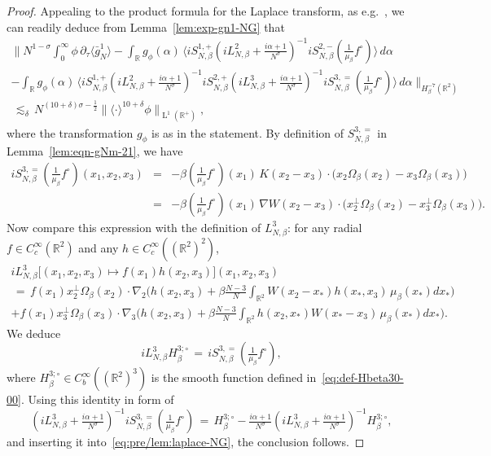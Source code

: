 \documentclass[a4paper,11pt,reqno,noindent]{amsart}
\theoremstyle{plain}
\numberwithin{equation}{section}
\newcommand{\R}{\mathbb R}
\newcommand{\3}{|\!|\!|}
\newcommand{\Ld}{\operatorname{L}}
\begin{document}
\begin{proof}
Appealing to the product formula for the Laplace transform, as e.g.~\cite[Lemma~5.2]{DSR-21}, we can readily deduce from Lemma~\ref{lem:exp-gn1-NG} that
\begin{multline}\label{eq:pre/lem:laplace-NG}
\Big\|N^{1-\sigma}\int_0^\infty\phi\,\partial_\tau \langle\bar g_N^1\rangle-\int_\R g_\phi(\alpha)\,\big\langle iS_{N,\beta}^{1,+}(iL_{N,\beta}^2+\tfrac{i\alpha+1}{N^\sigma})^{-1} iS_{N,\beta}^{2,-}(\tfrac1{\mu_\beta}f^\circ)\big\rangle\,d\alpha\\
-\int_\R g_\phi(\alpha)\,\big\langle iS_{N,\beta}^{1,+}(iL_{N,\beta}^2+\tfrac{i\alpha+1}{N^\sigma})^{-1}iS_{N,\beta}^{2,+}(iL_{N,\beta}^3+\tfrac{i\alpha+1}{N^\sigma})^{-1}iS_{N,\beta}^{3,=}(\tfrac1{\mu_\beta}f^\circ)\big\rangle\,d\alpha\Big\|_{H^{-7}_\beta(\R^2)}\\
\,\lesssim_\delta\,N^{(10+\delta)\sigma-\frac12}\|\langle\cdot\rangle^{10+\delta}\phi\|_{\Ld^1(\R^+)},
\end{multline}
where the transformation $g_\phi$ is as in the statement.
By definition of $S_{N,\beta}^{3,=}$ in Lemma~\ref{lem:eqn-gNm-21}, we have
\begin{eqnarray*}
iS_{N,\beta}^{3,=}(\tfrac1{\mu_\beta}f^\circ)(x_1,x_2,x_3)&=&-\beta (\tfrac1{\mu_\beta}f^\circ)(x_1) \,K(x_2-x_3)\cdot \big(x_2\Omega_\beta(x_2)-x_3\Omega_\beta(x_3)\big)\\
&=&-\beta (\tfrac1{\mu_\beta}f^\circ)(x_1) \,\nabla W(x_2-x_3)\cdot \big(x_2^\bot\Omega_\beta(x_2)-x_3^\bot\Omega_\beta(x_3)\big).
\end{eqnarray*}
Now compare this expression with the definition of $L_{N,\beta}^3$: for any radial $f\in C^\infty_c(\R^2)$ and any $h\in C^\infty_c((\R^2)^2)$,
\begin{multline*}
iL_{N,\beta}^3\big[(x_1,x_2,x_3)\mapsto f(x_1)h(x_2,x_3)\big](x_1,x_2,x_3)\\
\,=\,f(x_1)x_2^\bot\Omega_\beta(x_2)\cdot\nabla_2\Big(h(x_2,x_3)+\beta\tfrac{N-3}N\int_{\R^2}W(x_2-x_*)h(x_*,x_3)\,\mu_\beta(x_*)dx_*\Big)\\
+f(x_1)x_3^\bot\Omega_\beta(x_3)\cdot\nabla_3\Big(h(x_2,x_3)+\beta\tfrac{N-3}N\int_{\R^2} h(x_2,x_*)W(x_*-x_3)\,\mu_\beta(x_*)dx_*\Big).
\end{multline*}
We deduce
\begin{equation*}
iL_{N,\beta}^3H^{3;\circ}_\beta
\,=\,iS_{N,\beta}^{3,=}(\tfrac1{\mu_\beta}f^\circ),
\end{equation*}
where $H^{3;\circ}_\beta\in C^\infty_b((\R^2)^3)$ is the smooth function defined in~\eqref{eq:def-Hbeta30-00}.
Using this identity in form of
\[(iL_{N,\beta}^3+\tfrac{i\alpha+1}{N^\sigma})^{-1}iS_{N,\beta}^{3,=}(\tfrac1{\mu_\beta}f^\circ)\,=\,H^{3;\circ}_\beta-\tfrac{i\alpha+1}{N^\sigma}(iL_{N,\beta}^3+\tfrac{i\alpha+1}{N^\sigma})^{-1}H^{3;\circ}_\beta,\]
and inserting it into~\eqref{eq:pre/lem:laplace-NG}, the conclusion follows.
\end{proof}
\end{document}
